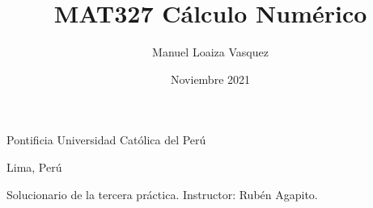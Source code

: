\title{MAT327 C\'alculo Num\'erico}
\author{Manuel Loaiza Vasquez}
\date{Noviembre 2021}



\maketitle

\vspace*{-0.25in}
\centerline{Pontificia Universidad Cat\'olica del Per\'u}
\centerline{Lima, Per\'u}
\centerline{}
\vspace*{0.15in}

\begin{framed}
  Solucionario de la tercera pr\'actica. Instructor: Rub\'en Agapito.
\end{framed}




